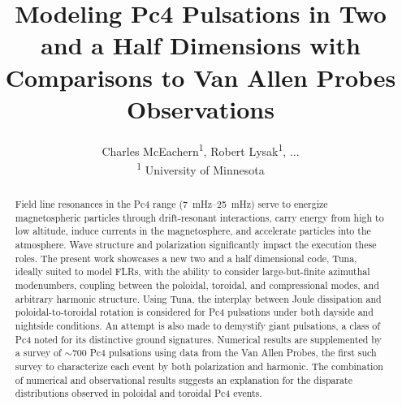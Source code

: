 \documentclass{article}
\newcommand{\about}{\ensuremath{\sim}}
\begin{document}
\title{Modeling Pc4 Pulsations in Two and a Half Dimensions with
       Comparisons to Van Allen Probes Observations}
\author{
    Charles McEachern\textsuperscript{1},
    Robert Lysak\textsuperscript{1},
    ... \\
    \textsuperscript{1} University of Minnesota
}




\maketitle



\begin{abstract}

Field line resonances in the Pc4 range (\SIrange{7}{25}{\mHz}) serve
to energize magnetospheric particles through drift-resonant
interactions, carry energy from high to low altitude, induce currents in
the magnetosphere, and accelerate particles into the atmosphere. Wave
structure and polarization significantly impact the execution these
roles. The present work showcases a new two and a half dimensional code,
Tuna, ideally suited to model FLRs, with the ability to consider
large-but-finite azimuthal modenumbers, coupling between the poloidal,
toroidal, and compressional modes, and arbitrary harmonic structure.
Using Tuna, the interplay between Joule dissipation and
poloidal-to-toroidal rotation is considered for Pc4 pulsations under
both dayside and nightside conditions. An attempt is also made to
demystify giant pulsations, a class of Pc4 noted for its distinctive
ground signatures. Numerical results are supplemented by a survey of
\about700 Pc4 pulsations using data from the Van Allen Probes, the first
such survey to characterize each event by both polarization and
harmonic. The combination of numerical and observational results
suggests an explanation for the disparate distributions observed in
poloidal and toroidal Pc4 events.

\end{abstract}

\end{document}
